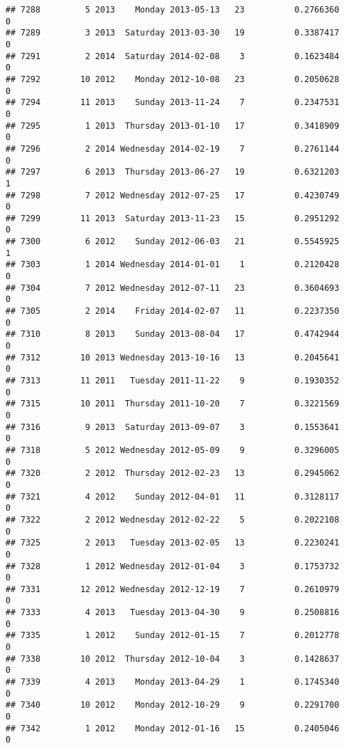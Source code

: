 \documentclass[
]{article}
\begin{document}
\begin{verbatim}
## 7288         5 2013    Monday 2013-05-13   23          0.2766360             0
## 7289         3 2013  Saturday 2013-03-30   19          0.3387417             0
## 7291         2 2014  Saturday 2014-02-08    3          0.1623484             0
## 7292        10 2012    Monday 2012-10-08   23          0.2050628             0
## 7294        11 2013    Sunday 2013-11-24    7          0.2347531             0
## 7295         1 2013  Thursday 2013-01-10   17          0.3418909             0
## 7296         2 2014 Wednesday 2014-02-19    7          0.2761144             0
## 7297         6 2013  Thursday 2013-06-27   19          0.6321203             1
## 7298         7 2012 Wednesday 2012-07-25   17          0.4230749             0
## 7299        11 2013  Saturday 2013-11-23   15          0.2951292             0
## 7300         6 2012    Sunday 2012-06-03   21          0.5545925             1
## 7303         1 2014 Wednesday 2014-01-01    1          0.2120428             0
## 7304         7 2012 Wednesday 2012-07-11   23          0.3604693             0
## 7305         2 2014    Friday 2014-02-07   11          0.2237350             0
## 7310         8 2013    Sunday 2013-08-04   17          0.4742944             0
## 7312        10 2013 Wednesday 2013-10-16   13          0.2045641             0
## 7313        11 2011   Tuesday 2011-11-22    9          0.1930352             0
## 7315        10 2011  Thursday 2011-10-20    7          0.3221569             0
## 7316         9 2013  Saturday 2013-09-07    3          0.1553641             0
## 7318         5 2012 Wednesday 2012-05-09    9          0.3296005             0
## 7320         2 2012  Thursday 2012-02-23   13          0.2945062             0
## 7321         4 2012    Sunday 2012-04-01   11          0.3128117             0
## 7322         2 2012 Wednesday 2012-02-22    5          0.2022108             0
## 7325         2 2013   Tuesday 2013-02-05   13          0.2230241             0
## 7328         1 2012 Wednesday 2012-01-04    3          0.1753732             0
## 7331        12 2012 Wednesday 2012-12-19    7          0.2610979             0
## 7333         4 2013   Tuesday 2013-04-30    9          0.2508816             0
## 7335         1 2012    Sunday 2012-01-15    7          0.2012778             0
## 7338        10 2012  Thursday 2012-10-04    3          0.1428637             0
## 7339         4 2013    Monday 2013-04-29    1          0.1745340             0
## 7340        10 2012    Monday 2012-10-29    9          0.2291700             0
## 7342         1 2012    Monday 2012-01-16   15          0.2405046             0

\end{verbatim}
\end{document}
